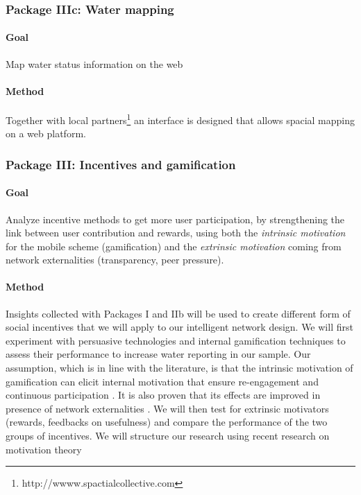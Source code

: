 \documentclass[11pt]{article}
\begin{document}
\subsubsection*{Package IIIc: Water mapping}
\paragraph{Goal} Map water status information on the web
\paragraph{Method} Together with local partners\footnote{http://wwww.spactialcollective.com} an interface is designed that allows spacial mapping on a web platform.

\subsubsection*{Package III: Incentives and gamification}
\paragraph{Goal} Analyze incentive methods to get more user participation, by strengthening the link between user contribution and rewards, using both the \emph{intrinsic motivation} for the mobile scheme (gamification) and the \emph{extrinsic motivation} coming from network externalities (transparency, peer pressure).
\paragraph{Method}
Insights collected with Packages I and IIb will be used to create different form of social incentives that we will apply to our intelligent network design. We will first experiment with persuasive technologies \citep{Oinas_Kukkonen2010, fogg2002persuasive} and internal gamification techniques \citep{blaschkeextrinsic, crowley2012gamification} to assess their performance to increase water reporting in our sample. Our assumption, which is in line with the literature, is that the intrinsic motivation of gamification can elicit internal motivation that ensure re-engagement and continuous participation \citep{lin2008elucidating, ling2005using}. It is also proven that its effects are improved in presence of network externalities \citep{lin2011people}. We will then test for extrinsic motivators (rewards, feedbacks on usefulness) and compare the performance of the two groups of incentives. We will structure our research using recent research on motivation theory \citep{davis1992extrinsic, kim2007value}
\end{document}
